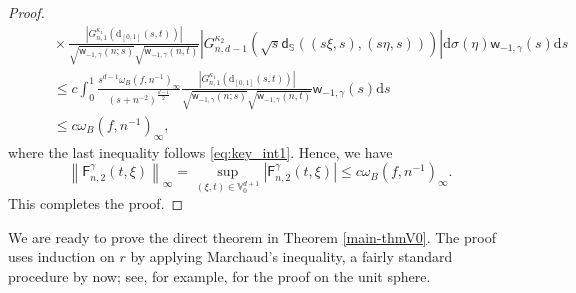 \documentclass{amsart}
\newtheorem{lem}[thm]{Lemma}
\theoremstyle{remark}
\def\d{\mathrm{d}}
\def\g{{\gamma}}
\def\k{{\kappa}}
\def\s{\sigma}
\def\SS{{\mathbb S}}
\def\VV{{\mathbb V}}
\def\d{\mathrm{d}}
\def\sF{{\mathsf F}}
\def\sG{{\mathsf G}}
\def\sL{{\mathsf L}}
\def\sd{{\mathsf d}}
\def\sw{{\mathsf w}}
\def\g{{\gamma}}
\def\k{{\kappa}}
\def\s{\sigma}
\def\SS{{\mathbb S}}
\def\VV{{\mathbb V}}
\def\f{\frac}
\def\f{\frac}
\begin{document}
\begin{proof}
\begin{align*}
	 &\qquad  \times \frac{ |G_{n,1}^{\k_1}(\d_{[0,1]}(s,t))| }{\sqrt{\sw_{-1,\g}(n; s)} \sqrt{\sw_{-1,\g}(n,t)}}  
	 \left |G_{n,d-1}^{\k_2}\left( \sqrt{s}\sd_{\SS} ((s\xi,s), (s \eta, s))\right) \right |  \d \s(\eta) \sw_{-1,\g}(s)\d s \\
	& \qquad\le c   \int_0^1\f{s^{d-1}  \omega_{B} (f , n^{-1})_{\infty }  }{(s+n^{-2})^{\f{d-1}{2}}} 
	   \frac{ |G_{n,1}^{\k_1}(\d_{[0,1]}(s,t))| }{\sqrt{\sw_{-1,\g}(n; s)} \sqrt{\sw_{-1,\g}(n,t)}}  \sw_{-1,\g}(s)\d s  \\ 
	 & \qquad   \leq c  \omega_{B} (f , n^{-1})_{\infty },
\end{align*} 
where  the last  inequality follows \eqref{eq:key_int1}.  Hence, we have 
$$  
\left \| \sF_{n,2}^\gamma(t,\xi) \right \|_\infty  
=\sup_{(\xi,t)\in\VV_0^{d+1}} |\sF_{n,2}^\gamma(t,\xi)| \leq c  \omega_{B} (f , n^{-1})_{\infty }.  
$$
This completes the proof. 
\end{proof}
 

We are ready to prove the direct theorem in Theorem \ref{main-thmV0}. The proof uses induction on $r$ by applying
Marchaud's inequality, a fairly standard procedure by now; see, for example, \cite[p. 94]{DaiX} for the proof on the 
unit sphere.  
\end{document}
